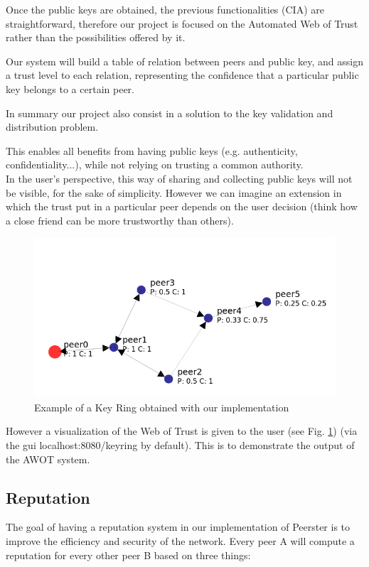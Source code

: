 \documentclass[]{article}
\begin{document}
Once the public keys are obtained, the previous functionalities (CIA) are straightforward, therefore our project is focused on the Automated Web of Trust rather than the possibilities offered by it.

Our system will build a table of relation between peers and public key, and assign a trust level to each relation, representing the confidence that a particular public key belongs to a certain peer.

In summary our project also consist in a solution to the key validation and distribution problem. 

This enables all benefits from having public keys (e.g. authenticity, confidentiality...), while not relying on trusting a common authority. \\

In the user's perspective, this way of sharing and collecting public keys will not be visible, for the sake of simplicity. However we can imagine an extension in which the trust put in a particular peer depends on the user decision (think how a close friend can be more trustworthy than others).


\begin{figure}[h]
	\includegraphics[width=\textwidth,height=\textheight,keepaspectratio]{keyring_example1}
	\centering
	\caption{Example of a Key Ring obtained with our implementation}
	\label{fig:keyring_ex1}
\end{figure}

However a visualization of the Web of Trust is given to the user (see Fig. \ref{fig:keyring_ex1}) (via the gui localhost:8080/keyring by default). This is to demonstrate the output of the AWOT system.

\subsection{Reputation}
\label{sec:goals-funcs-rep}
The goal of having a reputation system in our implementation of Peerster is to improve the efficiency and security of the network.
Every peer A will compute a reputation for every other peer B based on three things:
\end{document}
